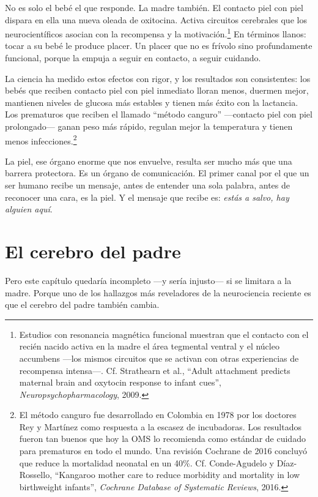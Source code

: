 No es solo el bebé el que responde. La madre también. El contacto piel con piel dispara en ella una nueva oleada de oxitocina. Activa circuitos cerebrales que los neurocientíficos asocian con la recompensa y la motivación.\footnote{Estudios con resonancia magnética funcional muestran que el contacto con el recién nacido activa en la madre el área tegmental ventral y el núcleo accumbens ---los mismos circuitos que se activan con otras experiencias de recompensa intensa---. Cf. Strathearn et al., ``Adult attachment predicts maternal brain and oxytocin response to infant cues'', \textit{Neuropsychopharmacology}, 2009.} En términos llanos: tocar a su bebé le produce placer. Un placer que no es frívolo sino profundamente funcional, porque la empuja a seguir en contacto, a seguir cuidando.

La ciencia ha medido estos efectos con rigor, y los resultados son consistentes: los bebés que reciben contacto piel con piel inmediato lloran menos, duermen mejor, mantienen niveles de glucosa más estables y tienen más éxito con la lactancia. Los prematuros que reciben el llamado ``método canguro'' ---contacto piel con piel prolongado--- ganan peso más rápido, regulan mejor la temperatura y tienen menos infecciones.\footnote{El método canguro fue desarrollado en Colombia en 1978 por los doctores Rey y Martínez como respuesta a la escasez de incubadoras. Los resultados fueron tan buenos que hoy la OMS lo recomienda como estándar de cuidado para prematuros en todo el mundo. Una revisión Cochrane de 2016 concluyó que reduce la mortalidad neonatal en un 40\%. Cf. Conde-Agudelo y Díaz-Rossello, ``Kangaroo mother care to reduce morbidity and mortality in low birthweight infants'', \textit{Cochrane Database of Systematic Reviews}, 2016.}

La piel, ese órgano enorme que nos envuelve, resulta ser mucho más que una barrera protectora. Es un órgano de comunicación. El primer canal por el que un ser humano recibe un mensaje, antes de entender una sola palabra, antes de reconocer una cara, es la piel. Y el mensaje que recibe es: \textit{estás a salvo, hay alguien aquí}.

\section{El cerebro del padre}

Pero este capítulo quedaría incompleto ---y sería injusto--- si se limitara a la madre. Porque uno de los hallazgos más reveladores de la neurociencia reciente es que el cerebro del padre también cambia.

